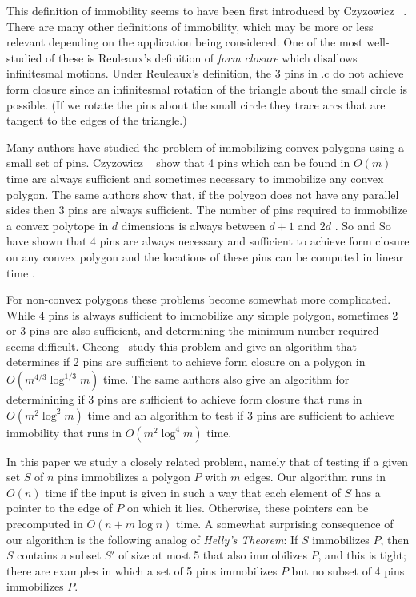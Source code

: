 \documentclass[lotsofwhite,charterfonts]{patmorin}
\begin{document}
This definition of immobility seems to have been first introduced by Czyzowicz
\etal\ \cite{X}.  There are many other definitions of immobility, which may be
more or less relevant depending on the application being considered.  One of
the most well-studied of these is Reuleaux's definition of \emph{form closure}
\cite{X} which disallows infinitesmal motions. Under Reuleaux's definition, the
3 pins in .c do not achieve form closure since an infinitesmal
rotation of the triangle about the small circle is possible. (If we rotate the
pins about the small circle they trace arcs that are tangent to the edges of
the triangle.)

Many authors have studied the problem of immobilizing convex polygons using a
small set of pins.  Czyzowicz \etal\ \cite{X} show that 4 pins which can be
found in $O(m)$ time are always sufficient and sometimes necessary to
immobilize any convex polygon.  The same authors show that, if the polygon
does not have any parallel sides then $3$ pins are always sufficient.  The
number of pins required to immobilize a convex polytope in $d$ dimensions is
always between $d+1$ and $2d$ \cite{X}.  So and So \cite{ssXX} have shown that
4 pins are always necessary and sufficient to achieve form closure on any
convex polygon and the locations of these pins can be computed in linear time
\cite{X}.

For non-convex polygons these problems become somewhat more complicated.  While
4 pins is always sufficient to immobilize any simple polygon, sometimes 2 or 3
pins are also sufficient, and determining the minimum number required seems
difficult.  Cheong \etal\ study this problem and give an algorithm that
determines if 2 pins are sufficient to achieve form closure on a polygon in
$O(m^{4/3}\log^{1/3} m)$ time.  The same authors also give an algorithm for
determinining if 3 pins are sufficient to achieve form closure that runs in
$O(m^2 \log^2 m)$ time and an algorithm to test if 3 pins are sufficient to
achieve immobility that runs in $O(m^2\log^4 m)$ time. 

In this paper we study a closely related problem, namely that of testing if a
given set $S$ of $n$ pins immobilizes a polygon $P$ with $m$ edges.  Our
algorithm runs in $O(n)$ time if the input is given in such a way that each
element of $S$ has a pointer to the edge of $P$ on which it lies.  Otherwise,
these pointers can be precomputed in $O(n + m\log n)$ time.  A somewhat
surprising consequence of our algorithm is the following analog of
\emph{Helly's Theorem}: If $S$ immobilizes $P$, then $S$ contains a subset $S'$
of size at most 5 that also immobilizes $P$, and this is tight;  there are
examples in which a set of 5 pins immobilizes $P$ but no subset of 4 pins
immobilizes $P$.  
\end{document}
